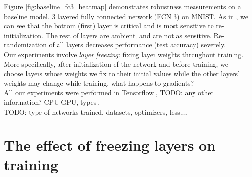 \documentclass{article}
\begin{document}
Figure \ref{fig:baseline_fc3_heatmap} demonstrates robustness measurements on a baseline model, 3 layered fully connected network (FCN 3) on MNIST. As in \cite{allLayers}, we can see that the bottom (first) layer is critical and is most sensitive to  re-initialization. The rest of layers are ambient, and are not as sensitive. Re-randomization of all layers decreases performance (test accuracy) severely.\\
Our experiments involve \emph{layer freezing}: fixing layer weights throughout training. More specifically, after initialization of the network and before training, we choose layers whose weights we fix to their initial values while the other layers' weights may change while training. what happens to gradients?\\
All our experiments were performed in Tensorflow \cite{tensorflow2015-whitepaper}, TODO: any other information? CPU-GPU, types..\\
TODO: type of networks trained, datasets, optimizers, loss....

\section{The effect of freezing layers on training} \label{training}
\end{document}
